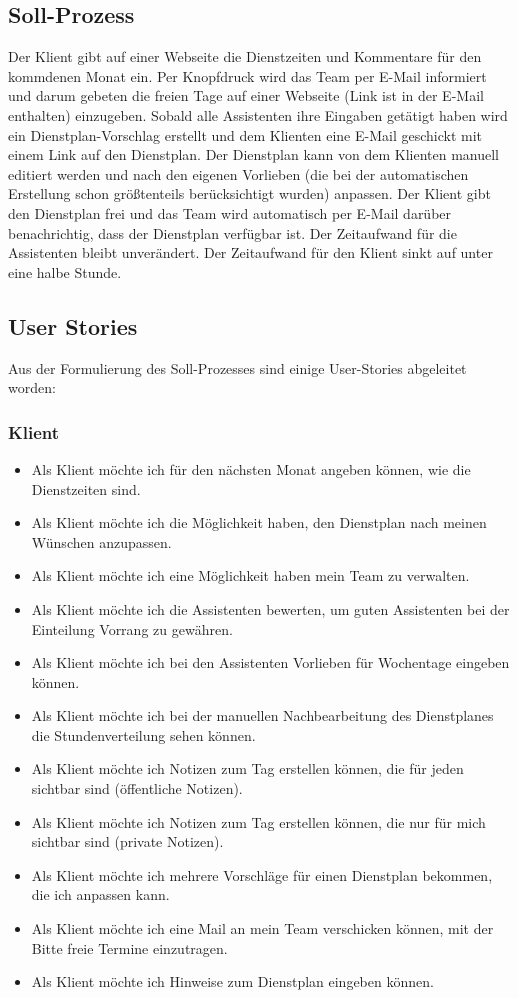 \documentclass[12pt,a4paper,titlepage]{article} %
\begin{document}
\subsection{Soll-Prozess}
Der Klient gibt auf einer Webseite die Dienstzeiten und Kommentare für den kommdenen Monat ein. Per Knopfdruck wird das Team per E-Mail informiert und darum gebeten die freien Tage auf einer Webseite (Link ist in der E-Mail enthalten) einzugeben. Sobald alle Assistenten ihre Eingaben getätigt haben wird ein Dienstplan-Vorschlag erstellt und dem Klienten eine E-Mail geschickt mit einem Link auf den Dienstplan. Der Dienstplan kann von dem Klienten manuell editiert werden und nach den eigenen Vorlieben (die bei der automatischen Erstellung schon größtenteils berücksichtigt wurden) anpassen. Der Klient gibt den Dienstplan frei und das Team wird automatisch per E-Mail darüber benachrichtig, dass der Dienstplan verfügbar ist.
Der Zeitaufwand für die Assistenten bleibt unverändert. Der Zeitaufwand für den Klient sinkt auf unter eine halbe Stunde.

\subsection{User Stories}
Aus der Formulierung des Soll-Prozesses sind einige User-Stories abgeleitet worden:

\subsubsection{Klient}
\begin{itemize}
\item Als Klient möchte ich für den nächsten Monat angeben können, wie die Dienstzeiten sind.
\item Als Klient möchte ich die Möglichkeit haben, den Dienstplan nach meinen Wünschen anzupassen.
\item Als Klient möchte ich eine Möglichkeit haben mein Team zu verwalten.
\item Als Klient möchte ich die Assistenten bewerten, um guten Assistenten bei der Einteilung Vorrang zu gewähren.
\item Als Klient möchte ich bei den Assistenten Vorlieben für Wochentage eingeben können.
\item Als Klient möchte ich bei der manuellen Nachbearbeitung des Dienstplanes die Stundenverteilung sehen können.
\item Als Klient möchte ich Notizen zum Tag erstellen können, die für jeden sichtbar sind (öffentliche Notizen).
\item Als Klient möchte ich Notizen zum Tag erstellen können, die nur für mich sichtbar sind (private Notizen).
\item Als Klient möchte ich mehrere Vorschläge für einen Dienstplan bekommen, die ich anpassen kann.
\item Als Klient möchte ich eine Mail an mein Team verschicken können, mit der Bitte freie Termine einzutragen.
\item Als Klient möchte ich Hinweise zum Dienstplan eingeben können.
\end{itemize}
\end{document}
